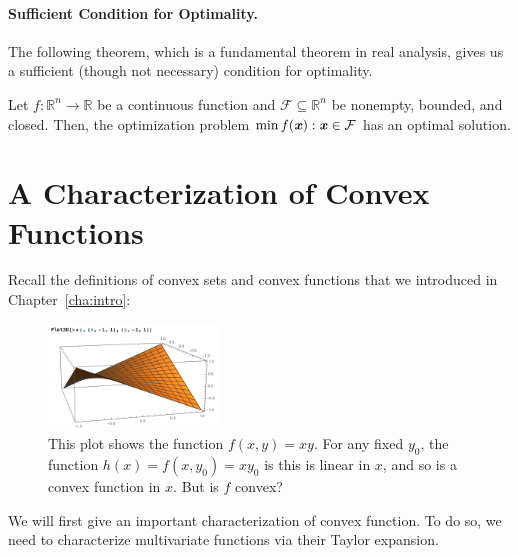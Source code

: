 \paragraph{Sufficient Condition for Optimality.}
The following theorem, which is a fundamental theorem in real analysis, gives us a sufficient (though not necessary) condition for optimality.
\begin{theorem*}
Let $f:\mathbb{R}^n \to \mathbb{R}$ be a continuous function and $\mathcal{F} \subseteq \mathbb{R}^n$ be nonempty, bounded, and closed.  Then, the optimization problem $\min f(\boldsymbol{\mathit{x}}) : \boldsymbol{\mathit{x}} \in \mathcal{F}$ has an optimal solution.
\end{theorem*}

\section{A Characterization of Convex Functions}
Recall the definitions of convex sets and convex functions that we
introduced in Chapter~\ref{cha:intro}:




\begin{figure}[h]
  \centering
     \includegraphics[width=0.4\textwidth]{fig/lecture2_plot3d-nonjointconvex.png}
\caption{This plot shows the function $f(x,y) = xy$. For any fixed
  $y_0$, the function $h(x) = f(x,y_0) = xy_0$ is
this is linear in $x$, and so is a convex
function in $x$. But is $f$ convex?}
\label{fig:nonjointconvex}
\end{figure}

We will first give an important characterization of convex function.  To do so, we need to characterize multivariate functions via their Taylor expansion.

